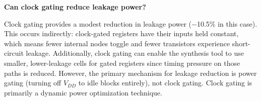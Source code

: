 \documentclass{article}
\begin{document}
\begin{tcolorbox}[colback=white, colframe=black, width=\textwidth, title=Answer 2.3]
\vspace{0.2cm}

\textbf{Can clock gating reduce leakage power?}

Clock gating provides a modest reduction in leakage power ($-$10.5\% in this case). This occurs indirectly: clock-gated registers have their inputs held constant, which means fewer internal nodes toggle and fewer transistors experience short-circuit leakage. Additionally, clock gating can enable the synthesis tool to use smaller, lower-leakage cells for gated registers since timing pressure on those paths is reduced. However, the primary mechanism for leakage reduction is power gating (turning off $V_{DD}$ to idle blocks entirely), not clock gating. Clock gating is primarily a dynamic power optimization technique.

\end{tcolorbox}
\end{document}

